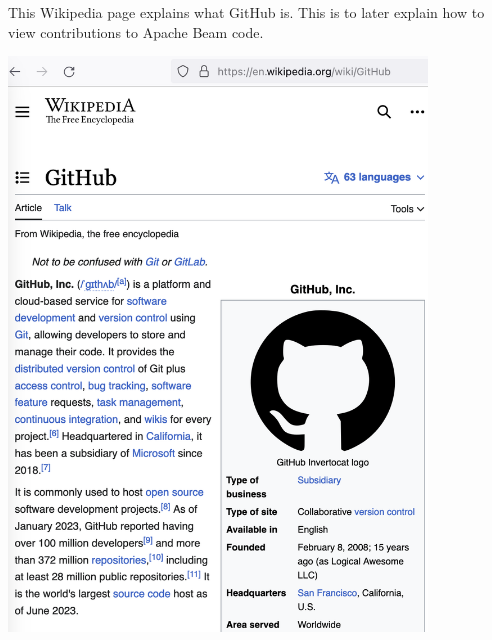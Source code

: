 
This Wikipedia page explains what GitHub is.
This is to later explain how to view \mrls contributions to Apache Beam code.

\begin{center}
    \includegraphics[width=30em]{github-wikipedia}
\end{center}

\pagebreak
